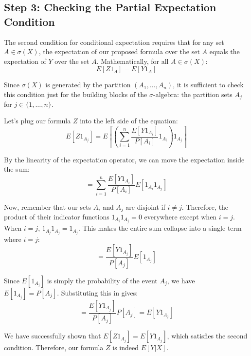 \subsection*{Step 3: Checking the Partial Expectation Condition}
The second condition for conditional expectation requires that for any set $A \in \sigma(X)$, the expectation of our proposed formula over the set $A$ equals the expectation of $Y$ over the set $A$. Mathematically, for all $A \in \sigma(X)$:
\[ E[Z 1_A] = E[Y 1_A] \]

Since $\sigma(X)$ is generated by the partition $(A_1, \dots, A_n)$, it is sufficient to check this condition just for the building blocks of the $\sigma$-algebra: the partition sets $A_j$ for $j \in \{1, \dots, n\}$.

Let's plug our formula $Z$ into the left side of the equation:
\[ E[Z 1_{A_j}] = E\left[ \left( \sum_{i=1}^n \frac{E[Y 1_{A_i}]}{P[A_i]} 1_{A_i} \right) 1_{A_j} \right] \]

By the linearity of the expectation operator, we can move the expectation inside the sum:
\[ = \sum_{i=1}^n \frac{E[Y 1_{A_i}]}{P[A_i]} E[1_{A_i} 1_{A_j}] \]

Now, remember that our sets $A_i$ and $A_j$ are disjoint if $i \neq j$. Therefore, the product of their indicator functions $1_{A_i} 1_{A_j} = 0$ everywhere except when $i = j$. When $i = j$, $1_{A_j} 1_{A_j} = 1_{A_j}$. This makes the entire sum collapse into a single term where $i = j$:
\[ = \frac{E[Y 1_{A_j}]}{P[A_j]} E[1_{A_j}] \]

Since $E[1_{A_j}]$ is simply the probability of the event $A_j$, we have $E[1_{A_j}] = P[A_j]$. Substituting this in gives:
\[ = \frac{E[Y 1_{A_j}]}{P[A_j]} P[A_j] = E[Y 1_{A_j}] \]

We have successfully shown that $E[Z 1_{A_j}] = E[Y 1_{A_j}]$, which satisfies the second condition. Therefore, our formula $Z$ is indeed $E[Y|X]$.